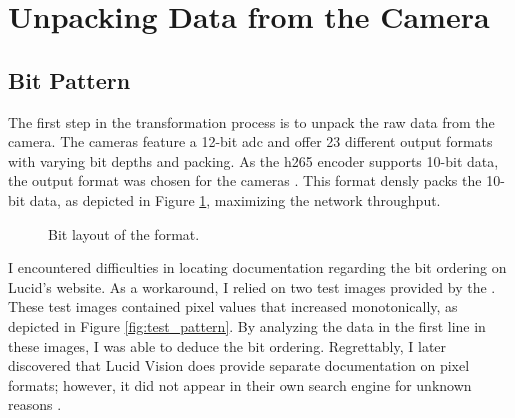 \section {Unpacking Data from the Camera}
\subsection{Bit Pattern}
\label{sec:unpacking}
The first step in the transformation process is to unpack the raw data from the camera.
The \lucid cameras feature a 12-bit \gls{adc} and offer 23 different output formats with varying bit depths and packing.
As the \gls{h265} encoder supports 10-bit data, the  output format was chosen for the cameras \cite[17 ]{nvidiaNVIDIAJetsonAGX2019}.
This format densly packs the 10-bit data, as depicted in Figure \ref{fig:mono10p}, maximizing the network throughput.

\begin{figure}[H]
    \centering
    \caption{Bit layout of the  format.}
    \label{fig:mono10p}
\end{figure}

I encountered difficulties in locating documentation regarding the bit ordering on Lucid's website.
As a workaround, I relied on two test images provided by the \cam.
These test images contained pixel values that increased monotonically, as depicted in Figure \ref{fig:test_pattern}.
By analyzing the data in the first line in these images, I was able to deduce the bit ordering.
Regrettably, I later discovered that Lucid Vision does provide separate documentation on pixel formats; however, it did not appear in their own search engine for unknown reasons \cite{lucidvisionlabsPixelFormatsLUCID2020}.


